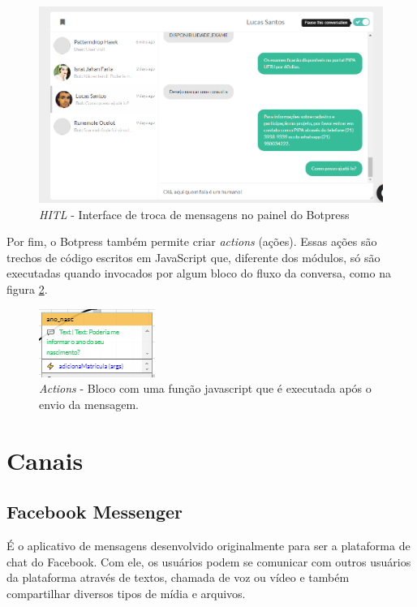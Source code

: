   \begin{figure}[h!]
  	\begin{center}
  		\includegraphics[width=0.95\linewidth]{images/hitl.png}
  		\caption{\textit{HITL} - Interface de troca de mensagens no painel do Botpress}
  		\label{fig:hitl}
  	\end{center}
  \end{figure}
  
  Por fim, o Botpress também permite criar \emph{actions} (ações). Essas ações são trechos de código escritos em JavaScript que, diferente dos módulos, só são executadas quando invocados por algum bloco do fluxo da conversa, como na figura \ref{fig:action}.
  
  \begin{figure}[h!]
  	\begin{center}
  		\includegraphics[width=0.35\linewidth]{images/action.png}
  		\caption{\textit{Actions} - Bloco com uma função javascript que é executada após o envio da mensagem.}
  		\label{fig:action}
  	\end{center}
  \end{figure}
  
  
  \section{Canais}
  \subsection{Facebook Messenger}
  É o aplicativo de mensagens desenvolvido originalmente para ser a plataforma de chat do Facebook. Com ele, os usuários podem se comunicar com outros usuários da plataforma através de textos, chamada de voz ou vídeo e também compartilhar diversos tipos de mídia e arquivos.%
  
